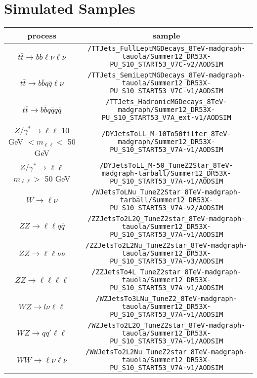 \chapter{Simulated Samples}


\begin{sidewaystable}[b] 
\small
\begin{tabular}{c|c}
 process & sample \\
\hline 
$t\bar{t} \rightarrow b\bar{b}\ell\nu \ell\nu$ & \verb+/TTJets_FullLeptMGDecays_8TeV-madgraph-tauola/Summer12_DR53X-PU_S10_START53_V7C-v2/AODSIM+ \\
$t\bar{t} \rightarrow b\bar{b}q\bar{q}\ell\nu$ & \verb+/TTJets_SemiLeptMGDecays_8TeV-madgraph-tauola/Summer12_DR53X-PU_S10_START53_V7C-v1/AODSIM+ \\
$t\bar{t} \rightarrow b\bar{b}q\bar{q}q\bar{q}$ & \verb+/TTJets_HadronicMGDecays_8TeV-madgraph/Summer12_DR53X-PU_S10_START53_V7A_ext-v1/AODSIM+ \\
\hline 
$Z/\gamma^{*} \rightarrow \ell\ell$ 10 GeV $< m_{\ell\ell} <$ 50 GeV & \verb+/DYJetsToLL_M-10To50filter_8TeV-madgraph/Summer12_DR53X-PU_S10_START53_V7A-v1/AODSIM+ \\
$Z/\gamma^{*} \rightarrow \ell\ell$ $m_{\ell\ell} >$ 50 GeV & \verb+/DYJetsToLL_M-50_TuneZ2Star_8TeV-madgraph-tarball/Summer12_DR53X-PU_S10_START53_V7A-v1/AODSIM+ \\
\hline 
$W \rightarrow \ell\nu$ & \verb+/WJetsToLNu_TuneZ2Star_8TeV-madgraph-tarball/Summer12_DR53X-PU_S10_START53_V7A-v2/AODSIM+ \\
\hline 
$ZZ \rightarrow \ell\ell q\bar{q}$ & \verb+/ZZJetsTo2L2Q_TuneZ2star_8TeV-madgraph-tauola/Summer12_DR53X-PU_S10_START53_V7A-v1/AODSIM+ \\
$ZZ \rightarrow \ell\ell\nu\nu$ & \verb+/ZZJetsTo2L2Nu_TuneZ2star_8TeV-madgraph-tauola/Summer12_DR53X-PU_S10_START53_V7A-v3/AODSIM+ \\
$ZZ \rightarrow \ell\ell\ell\ell$ & \verb+/ZZJetsTo4L_TuneZ2star_8TeV-madgraph-tauola/Summer12_DR53X-PU_S10_START53_V7A-v1/AODSIM+ \\
$WZ \rightarrow l\nu \ell\ell$ & \verb+/WZJetsTo3LNu_TuneZ2_8TeV-madgraph-tauola/Summer12_DR53X-PU_S10_START53_V7A-v1/AODSIM+ \\
$WZ \rightarrow qq'\ell\ell$ & \verb+/WZJetsTo2L2Q_TuneZ2star_8TeV-madgraph-tauola/Summer12_DR53X-PU_S10_START53_V7A-v1/AODSIM+ \\
$WW \rightarrow \ell\nu \ell\nu$ & \verb+/WWJetsTo2L2Nu_TuneZ2star_8TeV-madgraph-tauola/Summer12_DR53X-PU_S10_START53_V7A-v1/AODSIM+ \\

\end{tabular}
\end{sidewaystable}
